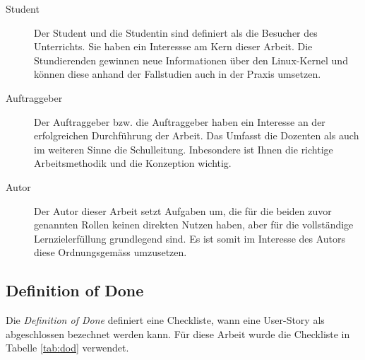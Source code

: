 \begin{description}
   \item[Student]
      Der Student und die Studentin sind definiert als die Besucher des Unterrichts. Sie haben ein Interessse am Kern dieser
      Arbeit. Die Stundierenden gewinnen neue Informationen über den Linux-Kernel und können diese anhand der Fallstudien auch in
      der Praxis umsetzen.  
   \item[Auftraggeber]
      Der Auftraggeber bzw. die Auftraggeber haben ein Interesse an der erfolgreichen Durchführung der Arbeit. Das Umfasst die
      Dozenten als auch im weiteren Sinne die Schulleitung. Inbesondere ist Ihnen die richtige Arbeitsmethodik und die Konzeption
      wichtig.
   \item[Autor]
      Der Autor dieser Arbeit setzt Aufgaben um, die für die beiden zuvor genannten Rollen keinen direkten Nutzen haben, aber für
      die vollständige Lernzielerfüllung grundlegend sind. Es ist somit im Interesse des Autors diese Ordnungsgemäss umzusetzen.
\end{description}

\subsection{Definition of Done}
\label{subsec:dod}
Die \emph{Definition of Done} definiert eine Checkliste,
wann eine User-Story als abgeschlossen bezechnet werden kann. Für diese Arbeit wurde
die Checkliste in Tabelle \ref{tab:dod} verwendet.


